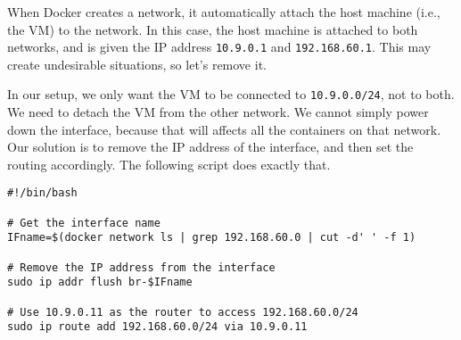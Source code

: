 
When Docker creates a network, it automatically attach the
host machine (i.e., the VM) to the network. In this
case, the host machine is attached to both
networks, and is given the IP address \texttt{10.9.0.1} and
\texttt{192.168.60.1}.
This may create undesirable situations,
so let's remove it.

In our setup, we only want the VM to be connected to
\texttt{10.9.0.0/24}, not to both.
We need to detach the VM from the other network. We cannot simply power down
the interface, because that will affects all the containers on that network.
Our solution is to remove the IP address
of the interface, and then set the routing accordingly. The following
script does exactly that.


\begin{lstlisting}
#!/bin/bash

# Get the interface name
IFname=$(docker network ls | grep 192.168.60.0 | cut -d' ' -f 1)

# Remove the IP address from the interface
sudo ip addr flush br-$IFname

# Use 10.9.0.11 as the router to access 192.168.60.0/24
sudo ip route add 192.168.60.0/24 via 10.9.0.11
\end{lstlisting}

